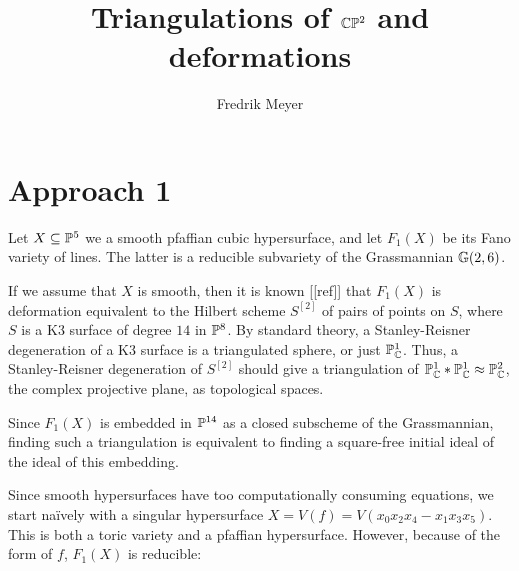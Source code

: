 \documentclass[11pt, english]{article}
\begin{document}
\title{Triangulations of $\mathbb{C} \mathbb{P}^2$ and deformations}
\author{Fredrik Meyer}
\maketitle 

\section{Approach 1}

Let $X \subseteq \mathbb{P}^5$ we a smooth pfaffian cubic hypersurface, and let $F_1(X)$ be its Fano variety of lines. The latter is a reducible subvariety of the Grassmannian $\mathbb{G}(2,6)$.

If we assume that $X$ is smooth, then it is known [[ref]] that $F_1(X)$ is deformation equivalent to the Hilbert scheme $S^{[2]}$ of pairs of points on $S$, where $S$ is a K3 surface of degree $14$ in $\mathbb{P}^8$. By standard theory, a Stanley-Reisner degeneration of a K3 surface is a triangulated sphere, or just $\mathbb{P}_{\mathbb{C}}^1$. Thus, a Stanley-Reisner degeneration of $S^{[2]}$ should give a triangulation of  $\mathbb{P}^1_{\mathbb{C}} \ast \mathbb{P}_{\mathbb{C}}^1 \approx \mathbb{P}^2_{\mathbb{C}}$, the complex projective plane, as topological spaces.

Since $F_1(X)$ is embedded in $\mathbb{P}^{14}$ as a closed subscheme of the Grassmannian, finding such a triangulation is equivalent to finding a square-free initial ideal of the ideal of this embedding. 

Since smooth hypersurfaces have too computationally consuming equations, we start naïvely with a singular hypersurface $X =V(f)= V(x_0x_2x_4-x_1x_3x_5)$. This is both a toric variety and a pfaffian hypersurface. However, because of the form of $f$, $F_1(X)$ is reducible:
\end{document}
